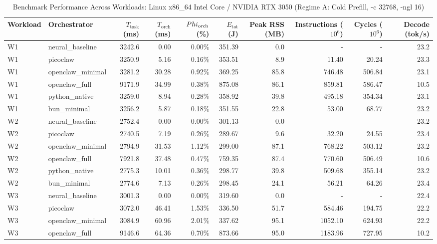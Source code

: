\begin{table}[t]
\centering\small
\caption{Benchmark Performance Across Workloads: Linux x86_64 Intel Core / NVIDIA RTX 3050 (Regime A: Cold Prefill, -c 32768, -ngl 16)}
\label{tab:linux_master_summary}
\begin{tabular}{llrrrrrrrr}
\toprule
Workload & Orchestrator & $T_{\text{task}}$ (ms) & $T_{\text{orch}}$ (ms) & $\\Phi_{\text{orch}}$ (\%) & $E_{\text{tot}}$ (J) & Peak RSS (MB) & Instructions ($10^6$) & Cycles ($10^6$) & Decode (tok/s) \\
\midrule
W1 & neural\_baseline & 3242.6 & 0.00 & 0.00\% & 351.39 & 0.0 & - & - & 23.2 \\
W1 & picoclaw & 3250.9 & 5.16 & 0.16\% & 353.51 & 8.9 & 11.40 & 20.24 & 23.3 \\
W1 & openclaw\_minimal & 3281.2 & 30.28 & 0.92\% & 369.25 & 85.8 & 746.48 & 506.84 & 23.1 \\
W1 & openclaw\_full & 9171.9 & 34.99 & 0.38\% & 875.08 & 86.1 & 859.81 & 586.47 & 10.5 \\
W1 & python\_native & 3259.0 & 8.94 & 0.28\% & 358.92 & 39.8 & 495.18 & 354.34 & 23.1 \\
W1 & bun\_minimal & 3256.2 & 5.87 & 0.18\% & 351.55 & 22.8 & 53.00 & 68.77 & 23.2 \\
\midrule
W2 & neural\_baseline & 2752.4 & 0.00 & 0.00\% & 301.13 & 0.0 & - & - & 23.2 \\
W2 & picoclaw & 2740.5 & 7.19 & 0.26\% & 289.67 & 9.6 & 32.20 & 24.55 & 23.4 \\
W2 & openclaw\_minimal & 2794.9 & 31.53 & 1.12\% & 299.00 & 87.1 & 768.22 & 503.12 & 23.2 \\
W2 & openclaw\_full & 7921.8 & 37.48 & 0.47\% & 759.35 & 87.4 & 770.60 & 506.49 & 10.6 \\
W2 & python\_native & 2775.3 & 10.01 & 0.36\% & 298.77 & 39.8 & 509.68 & 355.14 & 23.2 \\
W2 & bun\_minimal & 2774.6 & 7.13 & 0.26\% & 298.45 & 24.1 & 56.21 & 64.26 & 23.4 \\
\midrule
W3 & neural\_baseline & 3001.3 & 0.00 & 0.00\% & 319.60 & 0.0 & - & - & 22.4 \\
W3 & picoclaw & 3072.0 & 46.41 & 1.53\% & 336.50 & 51.7 & 584.46 & 194.75 & 22.2 \\
W3 & openclaw\_minimal & 3084.9 & 60.96 & 2.01\% & 337.62 & 95.1 & 1052.10 & 624.93 & 22.2 \\
W3 & openclaw\_full & 9146.6 & 64.36 & 0.70\% & 873.66 & 95.0 & 1183.96 & 727.95 & 10.2 \\

\end{tabular}
\end{table}
